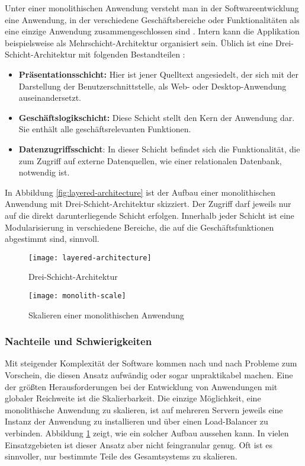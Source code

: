Unter einer monolithischen Anwendung versteht man in der Softwareentwicklung eine Anwendung, in der verschiedene Geschäftsbereiche oder Funktionalitäten als eine einzige Anwendung zusammengeschlossen sind \cite{FowlerMS}. Intern kann die Applikation beispielsweise als Mehrschicht-Architektur organisiert sein. Üblich ist eine Drei-Schicht-Architektur mit folgenden Bestandteilen \cite{FowlerPEA}:

\begin{itemize}
	\item \textbf{Präsentationsschicht:} Hier ist jener Quelltext angesiedelt, der sich mit der Darstellung der Benutzerschnittstelle, \zB als Web- oder Desktop-Anwendung auseinandersetzt.
	\item \textbf{Geschäftslogikschicht:} Diese Schicht stellt den Kern der Anwendung dar. Sie enthält alle geschäftsrelevanten Funktionen.
	\item \textbf{Datenzugriffsschicht}: In dieser Schicht befindet sich die Funktionalität, die zum Zugriff auf externe Datenquellen, wie \zB einer relationalen Datenbank, notwendig ist.
\end{itemize}


In Abbildung \ref{fig:layered-architecture} ist der Aufbau einer monolithischen Anwendung mit Drei-Schicht-Architektur skizziert. Der Zugriff darf jeweils nur auf die direkt darunterliegende Schicht erfolgen. Innerhalb jeder Schicht ist eine Modularisierung in verschiedene Bereiche, die auf die Geschäftsfunktionen abgestimmt sind, sinnvoll.

\begin{figure}[!htb]
\centering
{}
  \centering
	\texttt{[image: layered-architecture]}
	\caption{Drei-Schicht-Architektur}
	\label{fig:layered-architecture}
\endminipage
{}
  \centering
	\texttt{[image: monolith-scale]}
	\caption{Skalieren einer monolithischen Anwendung}
	\label{fig:monolith-scale}
\endminipage
\end{figure}

\subsubsection{Nachteile und Schwierigkeiten}

Mit steigender Komplexität der Software kommen nach und nach Probleme zum Vorschein, die diesen Ansatz aufwändig oder sogar unpraktikabel machen. Eine der größten Herausforderungen bei der Entwicklung von Anwendungen mit globaler Reichweite ist die Skalierbarkeit. Die einzige Möglichkeit, eine monolithische Anwendung zu skalieren, ist auf mehreren Servern jeweils eine Instanz der Anwendung zu installieren und über einen Load-Balancer zu verbinden. Abbildung \ref{fig:monolith-scale} zeigt, wie ein solcher Aufbau aussehen kann. In vielen Einsatzgebieten ist dieser Ansatz aber nicht feingranular genug. Oft ist es sinnvoller, nur bestimmte Teile des Gesamtsystems zu skalieren.


